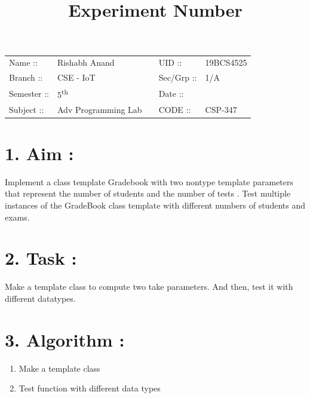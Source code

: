 \documentclass[14pt]{extarticle}
\title{%
    \textbf{
    \vspace{-3em} \\ 
    \Large Experiment Number \\
    \vspace{-4em}
    }
}
\author{}
\date{}
\begin{document}
\maketitle %

\section*{}
    \begin{tabular}{ llp{2cm}ll } 
        Name :: & Rishabh Anand & & UID :: & 19BCS4525  \\ 
        Branch :: & CSE - IoT & & Sec/Grp :: & 1/A \\ 
        Semester :: & 5\textsuperscript{th} & & Date :: & \shortdate{\today} \\
        Subject :: & Adv Programming Lab & & CODE :: & CSP-347  \\ 
    \end{tabular}
    
\vspace{1em}

\section*{\normalsize 1. Aim :}
    
Implement a class template Gradebook with two nontype template parameters that represent the number of students and the number of tests . Test multiple instances of the GradeBook class template with different numbers of students and exams.

\section*{\normalsize 2. Task :}
    
Make a template class to compute two take parameters. And then, test it with different datatypes.

\section*{\normalsize 3. Algorithm :}
    
    \begin{enumerate}
        \item Make a template class
        \item Test function with different data types
    \end{enumerate}
\end{document}
